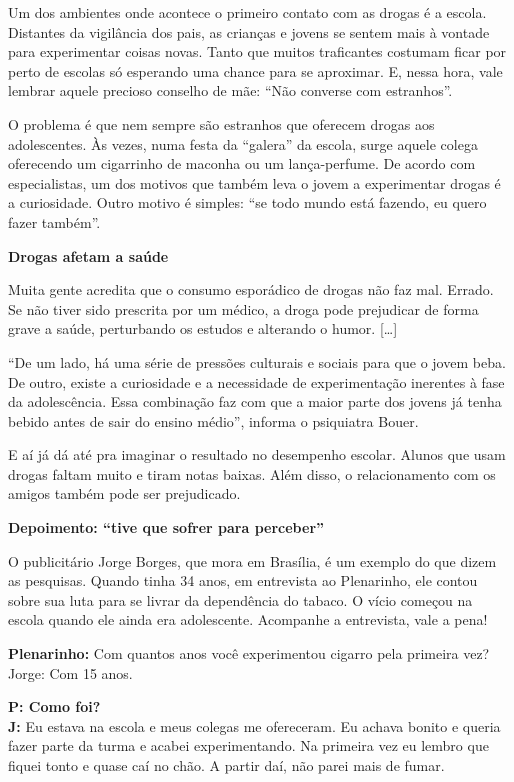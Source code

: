 \begin{itemize}
\begin{itemize}
{\begin{itemize}
\begin{itemize}
Um dos ambientes onde acontece o primeiro contato com as drogas é a
escola. Distantes da vigilância dos pais, as crianças e jovens se sentem
mais à vontade para experimentar coisas novas. Tanto que muitos
traficantes costumam ficar por perto de escolas só esperando uma chance
para se aproximar. E, nessa hora, vale lembrar aquele precioso conselho
de mãe: ``Não converse com estranhos''.

O problema é que nem sempre são estranhos que oferecem drogas aos
adolescentes. Às vezes, numa festa da ``galera'' da escola, surge aquele
colega oferecendo um cigarrinho de maconha ou um lança-perfume. De
acordo com especialistas, um dos motivos que também leva o jovem a
experimentar drogas é a curiosidade. Outro motivo é simples: ``se todo
mundo está fazendo, eu quero fazer também''.

\textbf{Drogas afetam a saúde}

Muita gente acredita que o consumo esporádico de drogas não faz mal.
Errado. Se não tiver sido prescrita por um médico, a droga pode
prejudicar de forma grave a saúde, perturbando os estudos e alterando o
humor. {[}\ldots{}{]}

``De um lado, há uma série de pressões culturais e sociais para que o
jovem beba. De outro, existe a curiosidade e a necessidade de
experimentação inerentes à fase da adolescência. Essa combinação faz com
que a maior parte dos jovens já tenha bebido antes de sair do ensino
médio'', informa o psiquiatra Bouer.

E aí já dá até pra imaginar o resultado no desempenho escolar. Alunos
que usam drogas faltam muito e tiram notas baixas. Além disso, o
relacionamento com os amigos também pode ser prejudicado.

\textbf{Depoimento: ``tive que sofrer para perceber''}

O publicitário Jorge Borges, que mora em Brasília, é um exemplo do que
dizem as pesquisas. Quando tinha 34 anos, em entrevista ao Plenarinho,
ele contou sobre sua luta para se livrar da dependência do tabaco. O
vício começou na escola quando ele ainda era adolescente. Acompanhe a
entrevista, vale a pena!

\textbf{Plenarinho:} Com quantos anos você experimentou cigarro pela
primeira vez?\\
Jorge: Com 15 anos.

\textbf{P: Como foi?\\
J:} Eu estava na escola e meus colegas me ofereceram. Eu achava bonito e
queria fazer parte da turma e acabei experimentando. Na primeira vez eu
lembro que fiquei tonto e quase caí no chão. A partir daí, não parei
mais de fumar.


\end{itemize}
\end{itemize}}
\end{itemize}
\end{itemize}
